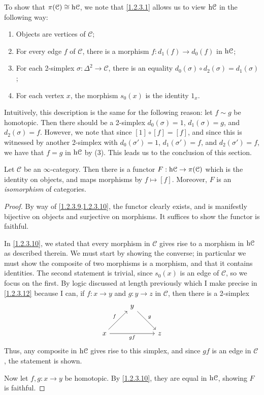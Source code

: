 \begin{remark}\label{1.2.3.10}
To show that $\pi (\mathcal{C} )\cong \mathrm{h} \mathcal{C} $, we note that \cref{1.2.3.1} allows us to view $\mathrm{h} \mathcal{C} $ in the following way:
\begin{enumerate}
	\item Objects are vertices of $\mathcal{C} $;
	\item For every edge $f$ of $\mathcal{C} $, there is a morphism $f : d_1(f) \to d_0(f)$ in $\mathrm{h} \mathcal{C} $;
	\item For each 2-simplex $\sigma : \Delta ^2 \to \mathcal{C} $, there is an equality $d_0(\sigma )\circ d_2(\sigma )=d_1(\sigma )$;
	\item For each vertex $x$, the morphism $s_0(x)$ is the identity $1_x$.
\end{enumerate}
Intuitively, this description is the same for the following reason: let $f\sim g$ be homotopic. Then there should be a 2-simplex $d_0(\sigma )=1$, $d_1(\sigma )=g$, and $d_2(\sigma )=f$. However, we note that since $[1]\circ [f]=[f]$, and since this is witnessed by another 2-simplex with $d_0(\sigma ')=1$, $d_1(\sigma ')=f$, and $d_2(\sigma ')=f$, we have that $f=g$ in $\mathrm{h} \mathcal{C} $ by (3). This leads us to the conclusion of this section.
\end{remark}

\begin{proposition}\label{1.2.3.11}
	Let $\mathcal{C} $ be an $\infty $-category. Then there is a functor $F : \mathrm{h} \mathcal{C}  \to \pi (\mathcal{C} )$ which is the identity on objects, and maps morphisms by $f\mapsto [f]$. Moreover, $F$ is an \emph{isomorphism} of categories.
\end{proposition}
\begin{proof}
	By way of \cref{1.2.3.9,1.2.3.10}, the functor clearly exists, and is manifestly bijective on objects and surjective on morphisms. It suffices to show the functor is faithful.

	In \cref{1.2.3.10}, we stated that every morphism in $\mathcal{C} $ gives rise to a morphism in $\mathrm{h} \mathcal{C} $ as described therein. We must start by showing the converse; in particular we must show the composite of two morphisms is a morphism, and that it contains identities. The second statement is trivial, since $s_0(x)$ is an edge of $\mathcal{C} $, so we focus on the first. By logic discussed at length previously which I make precise in \cref{1.2.3.12} because I can, if $f : x \to y$ and $g : y \to z$ in $\mathcal{C} $, then there is a 2-simplex
	\[\begin{tikzcd}[row sep = 2.5em, column sep = 2.5em]
	 & y \ar[" g ", dr]  &  \\
	x \ar[" f ", ur] \ar[" gf "', rr]  &  & z
	\end{tikzcd}\]
	Thus, any composite in $\mathrm{h} \mathcal{C} $ gives rise to this simplex, and since $gf$ is an edge in $\mathcal{C} $, the statement is shown.

	Now let $f,g : x \to y$ be homotopic. By \cref{1.2.3.10}, they are equal in $\mathrm{h} \mathcal{C} $, showing $F$ is faithful.
\end{proof}

